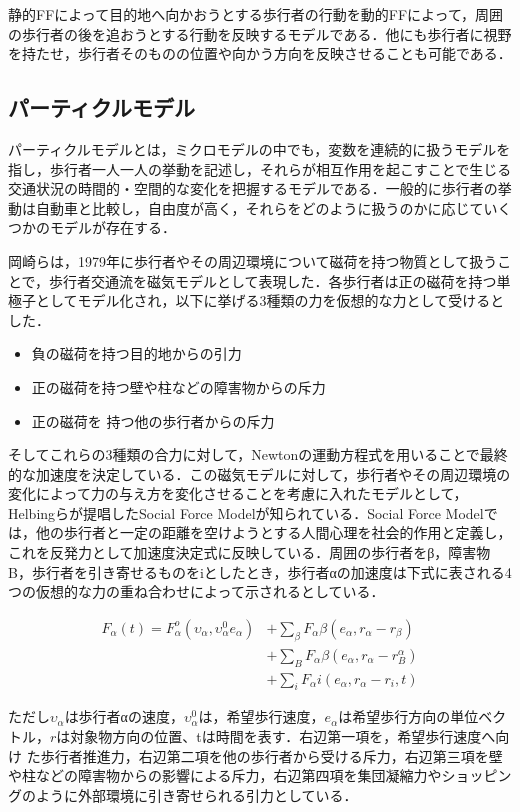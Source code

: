 静的FFによって目的地へ向かおうとする歩行者の行動を動的FFによって，周囲の歩行者の後を追おうとする行動を反映するモデルである．他にも歩行者に視野を持たせ，歩行者そのものの位置や向かう方向を反映させることも可能である．

\subsection{パーティクルモデル}

パーティクルモデルとは，ミクロモデルの中でも，変数を連続的に扱うモデルを指し，歩行者一人一人の挙動を記述し，それらが相互作用を起こすことで生じる交通状況の時間的・空間的な変化を把握するモデルである．一般的に歩行者の挙動は自動車と比較し，自由度が高く，それらをどのように扱うのかに応じていくつかのモデルが存在する．

岡崎らは，1979年に歩行者やその周辺環境について磁荷を持つ物質として扱うことで，歩行者交通流を磁気モデルとして表現した\cite{jiki_model}．各歩行者は正の磁荷を持つ単極子としてモデル化され，以下に挙げる3種類の力を仮想的な力として受けるとした．

\begin{itemize}
 \item 負の磁荷を持つ目的地からの引力
 \item 正の磁荷を持つ壁や柱などの障害物からの斥力
 \item 正の磁荷を 持つ他の歩行者からの斥力
\end{itemize}

そしてこれらの3種類の合力に対して，Newtonの運動方程式を用いることで最終的な加速度を決定している．この磁気モデルに対して，歩行者やその周辺環境の変化によって力の与え方を変化させることを考慮に入れたモデルとして，Helbingらが提唱したSocial Force Model\cite{SFM}が知られている．Social Force Modelでは，他の歩行者と一定の距離を空けようとする人間心理を社会的作用と定義し，これを反発力として加速度決定式に反映している．周囲の歩行者をβ，障害物B，歩行者を引き寄せるものをiとしたとき，歩行者αの加速度は下式に表される4つの仮想的な力の重ね合わせによって示されるとしている．

\begin{equation}
\begin{split}
 F_α(t)=F_α^o(υ_α,υ_α^0e_α)&+\sum_{β}F_αβ(e_α,r_α-r_β)\\
 &+\sum_{B}F_αβ(e_α,r_α-r_B^α)\\
 &+\sum_{i}F_αi(e_α,r_α-r_i,t)
\end{split}
\end{equation}

ただし$υ_α$は歩行者αの速度，$υ_α^0$は，希望歩行速度，$e_α$は希望歩行方向の単位ベクトル，$r$は対象物方向の位置、tは時間を表す．右辺第一項を，希望歩行速度へ向け
た歩行者推進力，右辺第二項を他の歩行者から受ける斥力，右辺第三項を壁や柱などの障害物からの影響による斥力，右辺第四項を集団凝縮力やショッピングのように外部環境に引き寄せられる引力としている．

